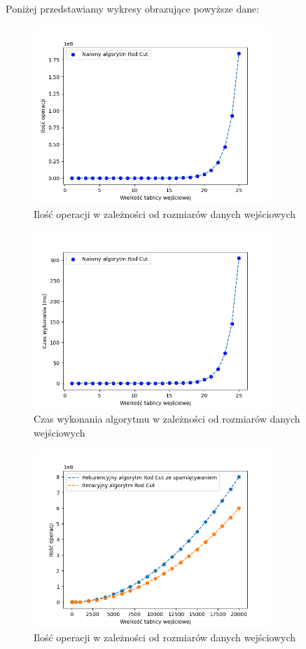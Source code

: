 \documentclass{article}
\begin{document}
Poniżej przedstawiamy wykresy obrazujące powyższe dane:
\begin{figure}[H]
    \centering
    \includegraphics[width=0.8\textwidth]{Figure_1.png}
    \caption{Ilość operacji w zależności od rozmiarów danych wejściowych}
    \label{fig:naive_cut_rod}
\end{figure}
\begin{figure}[H]
    \centering
    \includegraphics[width=0.8\textwidth]{Figure_3.png}
    \caption{Czas wykonania algorytmu w zależności od rozmiarów danych wejściowych}
    \label{fig:naive_cut_rodt}
\end{figure}
\begin{figure}[H]
    \centering
    \includegraphics[width=0.8\textwidth]{Figure_2.png}
    \caption{Ilość operacji w zależności od rozmiarów danych wejściowych}
    \label{fig:mi_cut_rod}
\end{figure}
\end{document}
